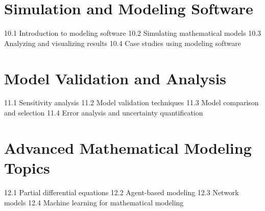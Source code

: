 \section{Simulation and Modeling Software}
10.1 Introduction to modeling software
10.2 Simulating mathematical models
10.3 Analyzing and visualizing results
10.4 Case studies using modeling software
\section{Model Validation and Analysis}
11.1 Sensitivity analysis
11.2 Model validation techniques
11.3 Model comparison and selection
11.4 Error analysis and uncertainty quantification
\section{Advanced Mathematical Modeling Topics}
12.1 Partial differential equations
12.2 Agent-based modeling
12.3 Network models
12.4 Machine learning for mathematical modeling
